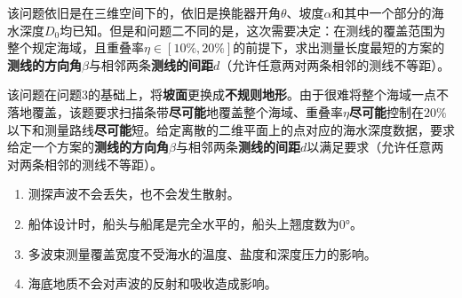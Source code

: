该问题依旧是在三维空间下的，依旧是换能器开角$\theta$、坡度$\alpha$和其中一个部分的海水深度$D_0$均已知。但是和问题二不同的是，这次需要决定：在测线的覆盖范围为整个规定海域，且重叠率$\eta \in [10\%, 20\%]$的前提下，求出测量长度最短的方案的\textbf{测线的方向角}$\beta$与相邻两条\textbf{测线的间距}$d$（允许任意两对两条相邻的测线不等距）。


该问题在问题3的基础上，将\textbf{坡面}更换成\textbf{不规则地形}。由于很难将整个海域一点不落地覆盖，该题要求扫描条带\textbf{尽可能}地覆盖整个海域、重叠率$\eta$\textbf{尽可能}控制在$20\%$以下和测量路线\textbf{尽可能}短。给定离散的二维平面上的点对应的海水深度数据，要求给定一个方案的\textbf{测线的方向角}$\beta$与相邻两条\textbf{测线的间距}$d$以满足要求（允许任意两对两条相邻的测线不等距）。




\begin{enumerate}
    \item 测探声波不会丢失，也不会发生散射。
    \item 船体设计时，船头与船尾是完全水平的，船头上翘度数为0°。
    \item 多波束测量覆盖宽度不受海水的温度、盐度和深度压力的影响。
    \item 海底地质不会对声波的反射和吸收造成影响。
\end{enumerate}




